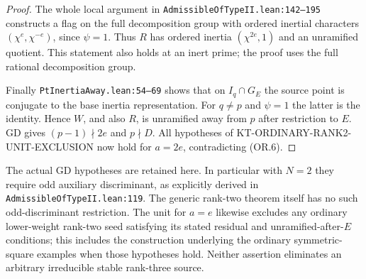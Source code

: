 \begin{proof}
The whole local argument in
\texttt{AdmissibleOfTypeII.lean:142--195}
constructs a flag on the full decomposition group
with ordered inertial characters
$(\chi^e,\chi^{-e})$, since $\psi=1$.
Thus $R$ has ordered inertia $(\chi^{2e},1)$
and an unramified quotient.  This statement
also holds at an inert prime; the proof uses
the full rational decomposition group.

Finally \texttt{PtInertiaAway.lean:54--69}
shows that on $I_q\cap G_E$ the source point is
conjugate to the base inertia representation.
For $q\ne p$ and $\psi=1$ the latter is the
identity.  Hence $W$, and also $R$, is
unramified away from $p$ after restriction to
$E$.  GD gives $(p-1)\nmid2e$ and $p\nmid D$.
All hypotheses of
KT-ORDINARY-RANK2-UNIT-EXCLUSION now hold for
$a=2e$, contradicting (OR.6).
\end{proof}

The actual GD hypotheses are retained here.  In
particular with $N=2$ they require odd auxiliary
discriminant, as explicitly derived in
\texttt{AdmissibleOfTypeII.lean:119}.
The generic rank-two theorem itself has no such
odd-discriminant restriction.  The unit for $a=e$
likewise excludes any ordinary lower-weight
rank-two seed satisfying its stated residual
and unramified-after-$E$ conditions; this includes
the construction underlying the ordinary
symmetric-square examples when those hypotheses
hold.  Neither assertion eliminates an arbitrary
irreducible stable rank-three source.
